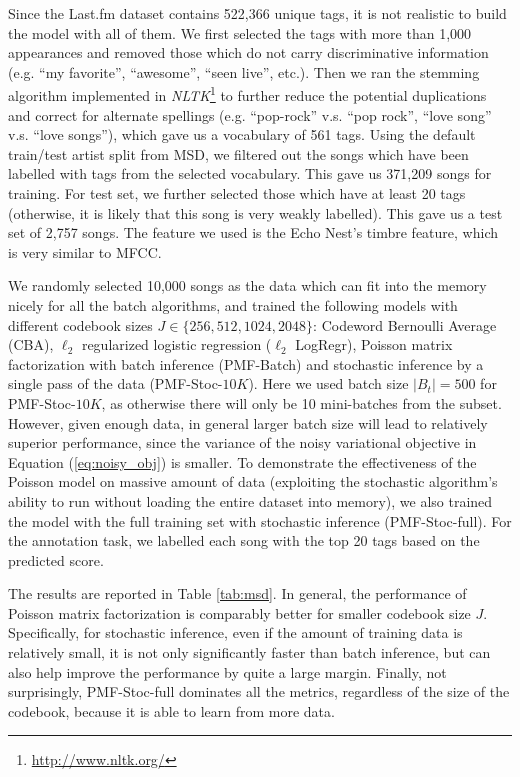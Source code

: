 Since the Last.fm dataset contains 522,366 unique tags, it is not realistic to build the model with all of them. We first selected the tags with more than 1,000 appearances and removed those which do not carry discriminative information (e.g. ``my favorite'', ``awesome'', ``seen live'', etc.). Then we ran the stemming algorithm implemented in \emph{NLTK}\footnote{\url{http://www.nltk.org/}} to further reduce the potential duplications and correct for alternate spellings (e.g. ``pop-rock'' v.s. ``pop rock'', ``love song'' v.s. ``love songs''), which gave us a vocabulary of 561 tags. Using the default train/test artist split from MSD, we filtered out the songs which have been labelled with tags from the selected vocabulary. This gave us 371,209 songs for training. For test set, we further selected those which have at least 20 tags (otherwise, it is likely that this song is very weakly labelled). This gave us a test set of 2,757 songs. The feature we used is the Echo Nest's timbre feature, which is very similar 
to MFCC. 

We randomly selected 10,000 songs as the data which can fit into the memory nicely for all the batch algorithms, and trained the following models with different codebook sizes $J \in \{256, 512, 1024, 2048 \}$: Codeword Bernoulli Average (CBA), $\ell_2$ regularized logistic regression ($\ell_2$ LogRegr), Poisson matrix factorization with batch inference (PMF-Batch) and stochastic inference by a single pass of the data (PMF-Stoc-$10K$). Here we used batch size $|B_t| = 500$ for PMF-Stoc-$10K$, as otherwise there will only be 10 mini-batches from the subset. However, given enough data, in general larger batch size will lead to relatively superior performance, since the variance of the noisy variational objective in Equation (\ref{eq:noisy_obj}) is smaller. To demonstrate the effectiveness of the Poisson model on massive amount of data (exploiting the stochastic algorithm's ability to run without loading the entire dataset into memory), we also trained the model with the full training set with stochastic 
inference (PMF-Stoc-full). For the annotation task, we labelled each song with the top 20 tags based on the predicted score. 

The results are reported in Table \ref{tab:msd}. In general, the performance of Poisson matrix factorization is comparably better for smaller codebook size $J$. Specifically, for stochastic inference, even if the amount of training data is relatively small,  it is not only significantly faster than batch inference, but can also help improve the performance by quite a large margin. Finally, not surprisingly, PMF-Stoc-full dominates all the metrics, regardless of the size of the codebook, because it is able to learn from more data. 


